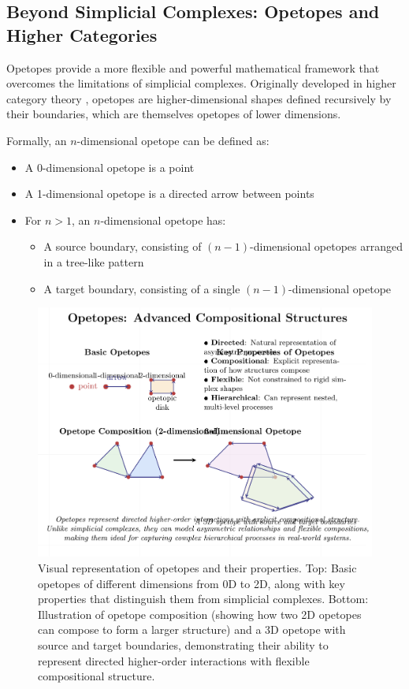 \subsection{Beyond Simplicial Complexes: Opetopes and Higher Categories}
Opetopes provide a more flexible and powerful mathematical framework that overcomes the limitations of simplicial complexes. Originally developed in higher category theory \citep{cheng2004higher, kock2010polynomial}, opetopes are higher-dimensional shapes defined recursively by their boundaries, which are themselves opetopes of lower dimensions.

Formally, an $n$-dimensional opetope can be defined as:
\begin{itemize}
    \item A 0-dimensional opetope is a point
    \item A 1-dimensional opetope is a directed arrow between points
    \item For $n>1$, an $n$-dimensional opetope has:
    \begin{itemize}
        \item A source boundary, consisting of $(n-1)$-dimensional opetopes arranged in a tree-like pattern
        \item A target boundary, consisting of a single $(n-1)$-dimensional opetope
    \end{itemize}
\end{itemize}

\begin{figure}[htbp]
    \centering
    \includegraphics[width=\textwidth]{figures/opetope_structures-1.png}
    \caption{Visual representation of opetopes and their properties. Top: Basic opetopes of different dimensions from 0D to 2D, along with key properties that distinguish them from simplicial complexes. Bottom: Illustration of opetope composition (showing how two 2D opetopes can compose to form a larger structure) and a 3D opetope with source and target boundaries, demonstrating their ability to represent directed higher-order interactions with flexible compositional structure.}
    \label{fig:opetope_structures}
\end{figure}

